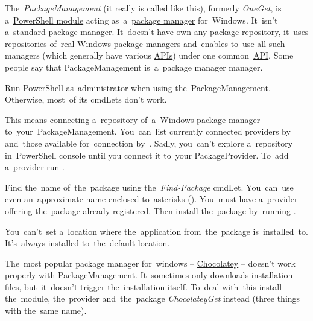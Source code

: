 \label{powershellpackagemanagement}
The~\textit{PackageManagement} (it really is called like this), formerly \textit{OneGet}, is a~\hyperref[powershellmodule]{PowerShell module} acting as~a~\hyperref[packagemanager]{package manager} for~Windows.
It~isn't a~standard package manager.
It~doesn't have own any package repository, it~uses repositories of~real Windows package managers and~enables to~use all such managers (which generally have various \hyperref[api]{APIs}) under one common~\hyperref[api]{API}.
Some people say that PackageManagement is~a~package manager manager.

\warning Run PowerShell as~administrator when using the~PackageManagement.
Otherwise, most~of its cmdLets don't work.

This means connecting a~repository of~a~Windows package manager to~your~PackageManagement.
You~can~list currently connected providers by~ and~those available for~connection by~.
Sadly, you~can't explore a~repository in~PowerShell console until you connect it to~your PackageProvider.
To~add a~provider run .

Find the~name of~the~package using the~\textit{Find-Package} cmdLet.
You~can~use even an~approximate name enclosed to~asterisks ().
You~must have a~provider offering the~package already registered.
Then install the~package by~running .

\note You~can't~set a~location where the~application from~the~package is~installed~to.
It's~always installed to~the~default location.

\warning The~most popular package manager for~windows -- \href{https://chocolatey.org/}{Chocolatey} --  doesn't work properly with PackageManagement.
It~sometimes only downloads installation files, but~it~doesn't trigger the~installation itself.
To~deal with~this install the~module, the~provider and~the~package \textit{ChocolateyGet} instead (three things with the~same name).
